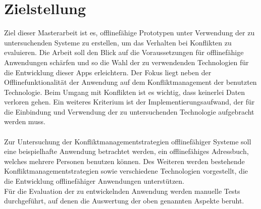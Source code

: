 \section{Zielstellung}
Ziel dieser Masterarbeit ist es, offlinefähige Prototypen unter Verwendung der zu untersuchenden Systeme zu erstellen, um das Verhalten bei Konflikten zu evaluieren.
Die Arbeit soll den Blick auf die Voraussetzungen für offlinefähige Anwendungen schärfen und so die Wahl der zu verwendenden Technologien für die Entwicklung dieser \glspl{App} erleichtern.
Der Fokus liegt neben der Offlinefunktionalität der Anwendung auf dem Konfliktmanagement der benutzten Technologie.
Beim Umgang mit Konflikten ist es wichtig, dass keinerlei Daten verloren gehen.
Ein weiteres Kriterium ist der Implementierungsaufwand, der für die Einbindung und Verwendung der zu untersuchenden Technologie aufgebracht werden muss.\\\\
%
Zur Untersuchung der Konfliktmanagementstrategien offlinefähiger Systeme soll eine beispielhafte Anwendung betrachtet werden, ein offlinefähiges Adressbuch, welches mehrere Personen benutzen können.
Des Weiteren werden bestehende Konfliktmanagementstrategien sowie verschiedene Technologien vorgestellt, die die Entwicklung offlinefähiger Anwendungen unterstützen.\\
Für die Evaluation der zu entwickelnden Anwendung werden manuelle Tests durchgeführt, auf denen die Auswertung der oben genannten Aspekte beruht.